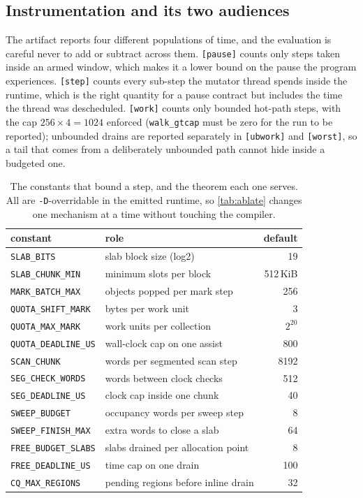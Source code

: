 \subsection{Instrumentation and its two audiences}
\label{sec:impl-instr}

The artifact reports four different populations of time, and the evaluation is careful never to
add or subtract across them.
\texttt{[pause]} counts only steps taken inside an armed window, which makes it a lower bound
on the pause the program experiences.  \texttt{[step]} counts every sub-step the mutator thread
spends inside the runtime, which is the right quantity for a pause contract but includes the time
the thread was descheduled.  \texttt{[work]} counts only bounded hot-path steps, with the cap
$256\times4=1024$ enforced (\texttt{walk\_gtcap} must be zero for the run to be reported);
unbounded drains are reported separately in \texttt{[ubwork]} and \texttt{[worst]}, so a
tail that comes from a deliberately unbounded path cannot hide inside a budgeted one.

\begin{table}[t]
\centering
\small
\caption{The constants that bound a step, and the theorem each one serves.  All are
\texttt{-D}-overridable in the emitted runtime, so \tab\ref{tab:ablate} changes one mechanism at a
time without touching the compiler.}
\label{tab:budgets}
\begin{tabular}{@{}llr@{}}
\toprule
constant & role & default \\
\midrule
\texttt{SLAB\_BITS}          & slab block size (log2) & 19 \\
\texttt{SLAB\_CHUNK\_MIN}    & minimum slots per block & 512\,KiB \\
\texttt{MARK\_BATCH\_MAX}    & objects popped per mark step & 256 \\
\texttt{QUOTA\_SHIFT\_MARK}  & bytes per work unit & 3 \\
\texttt{QUOTA\_MAX\_MARK}    & work units per collection & $2^{20}$ \\
\texttt{QUOTA\_DEADLINE\_US} & wall-clock cap on one assist & 800 \\
\texttt{SCAN\_CHUNK}         & words per segmented scan step & 8192 \\
\texttt{SEG\_CHECK\_WORDS}   & words between clock checks & 512 \\
\texttt{SEG\_DEADLINE\_US}   & clock cap inside one chunk & 40 \\
\texttt{SWEEP\_BUDGET}       & occupancy words per sweep step & 8 \\
\texttt{SWEEP\_FINISH\_MAX}  & extra words to close a slab & 64 \\
\texttt{FREE\_BUDGET\_SLABS} & slabs drained per allocation point & 8 \\
\texttt{FREE\_DEADLINE\_US}  & time cap on one drain & 100 \\
\texttt{CQ\_MAX\_REGIONS}    & pending regions before inline drain & 32 \\
\bottomrule
\end{tabular}
\end{table}

